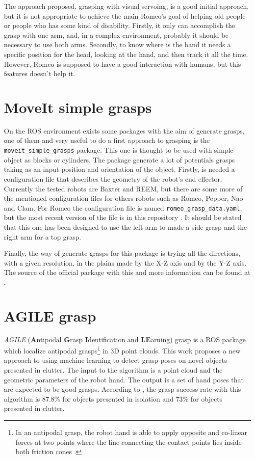 \documentclass[12pt,a4paper,final,twoside,openright]{report}
\begin{document}
The approach proposed, grasping with visual servoing, is a good initial approach, but it is not appropriate to achieve the main Romeo's goal of helping old people or people who has some kind of disability. Firstly, it only can accomplish the grasp with one arm, and, in a complex environment, probably it should be necessary to use both arms. Secondly, to know where is the hand it needs a specific position for the head, looking at the hand, and then track it all the time. However, Romeo is supposed to have a good interaction with humans, but this features doesn't help it.

\section{MoveIt simple grasps}
\label{sec:moveit_simple_grasps}

On the ROS environment exists some packages with the aim of generate grasps, one of them and very useful to do a first approach to grasping is the \texttt{moveit\_simple\_grasps} package. This one is thought to be used with simple object as blocks or cylinders. The package generate a lot of potentials grasps taking as an input position and orientation of the object. Firstly, is needed a configuration file that describes the geometry of the robot's end effector. Currently the tested robots are Baxter and REEM, but there are some more of the mentioned configuration files for others robots such as Romeo, Pepper, Nao and Clam. For Romeo the configuration file is named \texttt{romeo\_grasp\_data.yaml}, but the most recent version of the file is in this repository \cite{gitNlyubovaGrasp}. It should be stated that this one has been designed to use the left arm to made a side grasp and the right arm for a top grasp.

Finally, the way of generate grasps for this package is trying all the directions, with a given resolution, in the plains made by the X-Z axis and by the Y-Z axis. The source of the official package with this and more information can be found at \cite{gitMoveitSimpleGrasp}.

\section{AGILE grasp}
\label{sec:agile grasp}

\textit{AGILE} (\textbf{A}ntipodal \textbf{G}rasp \textbf{I}dentification and \textbf{LE}arning) grasp is a ROS package \cite{Pas} which localize antipodal grasps\footnote{In an antipodal grasp, the robot hand is able to apply opposite and co-linear forces at two points where the line connecting the contact points lies inside both friction cones \cite{DBLP:journals/corr/PasP15}.} in 3D point clouds. This work \cite{DBLP:journals/corr/PasP15} proposes a new approach to using machine learning to detect grasp poses on novel objects presented in clutter. The input to the algorithm is a point cloud and the geometric parameters of the robot hand. The output is a set of hand poses that are expected to be good grasps. According to \cite{DBLP:journals/corr/PasP15}, the grasp success rate with this algorithm is $87.8 \%$ for objects presented in isolation and $73 \%$ for objects presented in clutter. 
\end{document}
